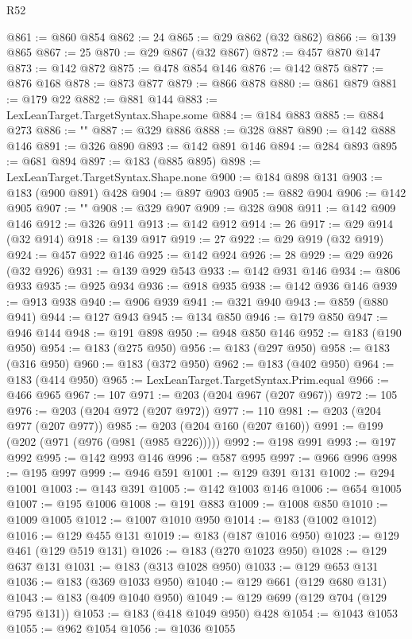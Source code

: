 \begin{lexlean}{R52}
\begin{coremodule}
{{{{{{{{{{{{{{{{{{{{{{{{{{{{{{{{{{{{{{{{{{{{{{{{{{{{{{{{{{{{{{{{{{{{{{{{{{{{{{{{{{{{{{{{{{{{{{{{{{{{{{{{{{{{{{{{{{{{{{{{{{{{{{{{{{{{{{{{{{{{{{{{{{{{{{{{{{{{{{{{{{{{{{{{{{{{{{{{{{{{{{{{{{{{{{{{{{{{{{@861 := @860 @854
@862 := 24
@865 := @29 @862 (@32 @862)
@866 := @139 @865
@867 := 25
@870 := @29 @867 (@32 @867)
@872 := @457 @870 @147
@873 := @142 @872
@875 := @478 @854 @146
@876 := @142 @875
@877 := @876 @168
@878 := @873 @877
@879 := @866 @878
@880 := @861 @879
@881 := @179 @22
@882 := @881 @144
@883 := LexLeanTarget.TargetSyntax.Shape.some
@884 := @184 @883
@885 := @884 @273
@886 := "{"
@887 := @329 @886
@888 := @328 @887
@890 := @142 @888 @146
@891 := @326 @890
@893 := @142 @891 @146
@894 := @284 @893
@895 := @681 @894
@897 := @183 (@885 @895)
@898 := LexLeanTarget.TargetSyntax.Shape.none
@900 := @184 @898 @131
@903 := @183 (@900 @891) @428
@904 := @897 @903
@905 := @882 @904
@906 := @142 @905
@907 := "}"
@908 := @329 @907
@909 := @328 @908
@911 := @142 @909 @146
@912 := @326 @911
@913 := @142 @912
@914 := 26
@917 := @29 @914 (@32 @914)
@918 := @139 @917
@919 := 27
@922 := @29 @919 (@32 @919)
@924 := @457 @922 @146
@925 := @142 @924
@926 := 28
@929 := @29 @926 (@32 @926)
@931 := @139 @929 @543
@933 := @142 @931 @146
@934 := @806 @933
@935 := @925 @934
@936 := @918 @935
@938 := @142 @936 @146
@939 := @913 @938
@940 := @906 @939
@941 := @321 @940
@943 := @859 (@880 @941)
@944 := @127 @943
@945 := @134 @850
@946 := @179 @850
@947 := @946 @144
@948 := @191 @898
@950 := @948 @850 @146
@952 := @183 (@190 @950)
@954 := @183 (@275 @950)
@956 := @183 (@297 @950)
@958 := @183 (@316 @950)
@960 := @183 (@372 @950)
@962 := @183 (@402 @950)
@964 := @183 (@414 @950)
@965 := LexLeanTarget.TargetSyntax.Prim.equal
@966 := @466 @965
@967 := 107
@971 := @203 (@204 @967 (@207 @967))
@972 := 105
@976 := @203 (@204 @972 (@207 @972))
@977 := 110
@981 := @203 (@204 @977 (@207 @977))
@985 := @203 (@204 @160 (@207 @160))
@991 := @199 (@202 (@971 (@976 (@981 (@985 @226)))))
@992 := @198 @991
@993 := @197 @992
@995 := @142 @993 @146
@996 := @587 @995
@997 := @966 @996
@998 := @195 @997
@999 := @946 @591
@1001 := @129 @391 @131
@1002 := @294 @1001
@1003 := @143 @391
@1005 := @142 @1003 @146
@1006 := @654 @1005
@1007 := @195 @1006
@1008 := @191 @883
@1009 := @1008 @850
@1010 := @1009 @1005
@1012 := @1007 @1010 @950
@1014 := @183 (@1002 @1012)
@1016 := @129 @455 @131
@1019 := @183 (@187 @1016 @950)
@1023 := @129 @461 (@129 @519 @131)
@1026 := @183 (@270 @1023 @950)
@1028 := @129 @637 @131
@1031 := @183 (@313 @1028 @950)
@1033 := @129 @653 @131
@1036 := @183 (@369 @1033 @950)
@1040 := @129 @661 (@129 @680 @131)
@1043 := @183 (@409 @1040 @950)
@1049 := @129 @699 (@129 @704 (@129 @795 @131))
@1053 := @183 (@418 @1049 @950) @428
@1054 := @1043 @1053
@1055 := @962 @1054
@1056 := @1036 @1055
}}}}}}}}}}}}}}}}}}}}}}}}}}}}}}}}}}}}}}}}}}}}}}}}}}}}}}}}}}}}}}}}}}}}}}}}}}}}}}}}}}}}}}}}}}}}}}}}}}}}}}}}}}}}}}}}}}}}}}}}}}}}}}}}}}}}}}}}}}}}}}}}}}}}}}}}}}}}}}}}}}}}}}}}}}}}}}}}}}}}}}}}}}}}}}}}}}}}}}
\end{coremodule}
\end{lexlean}
